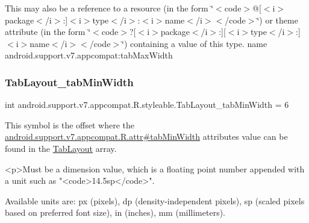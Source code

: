 This may also be a reference to a resource (in the form \char`\"{}$<$code$>$@\mbox{[}$<$i$>$package$<$/i$>$\+:\mbox{]}$<$i$>$type$<$/i$>$\+:$<$i$>$name$<$/i$>$$<$/code$>$\char`\"{}) or theme attribute (in the form \char`\"{}$<$code$>$?\mbox{[}$<$i$>$package$<$/i$>$\+:\mbox{]}\mbox{[}$<$i$>$type$<$/i$>$\+:\mbox{]}$<$i$>$name$<$/i$>$$<$/code$>$\char`\"{}) containing a value of this type.  name android.\+support.\+v7.\+appcompat\+:tab\+Max\+Width \mbox{\label{classandroid_1_1support_1_1v7_1_1appcompat_1_1R_1_1styleable_a5b1f2d52d72419e4e3a54aaae5581f99}} 
\subsubsection{\texorpdfstring{Tab\+Layout\+\_\+tab\+Min\+Width}{TabLayout\_tabMinWidth}}
{\footnotesize\ttfamily int android.\+support.\+v7.\+appcompat.\+R.\+styleable.\+Tab\+Layout\+\_\+tab\+Min\+Width = 6\hspace{0.3cm}{\ttfamily [static]}}

This symbol is the offset where the \hyperlink{classandroid_1_1support_1_1v7_1_1appcompat_1_1R_1_1attr_a041fb93bdb43040bd8123acef375698e}{android.\+support.\+v7.\+appcompat.\+R.\+attr\#tab\+Min\+Width} attribute\textquotesingle{}s value can be found in the \hyperlink{classandroid_1_1support_1_1v7_1_1appcompat_1_1R_1_1styleable_a3c85d0c4cebbccf5b1a16ecfe13938ca}{Tab\+Layout} array.

\begin{DoxyVerb}      <p>Must be a dimension value, which is a floating point number appended with a unit such as "<code>14.5sp</code>".
\end{DoxyVerb}
 Available units are\+: px (pixels), dp (density-\/independent pixels), sp (scaled pixels based on preferred font size), in (inches), mm (millimeters). 


